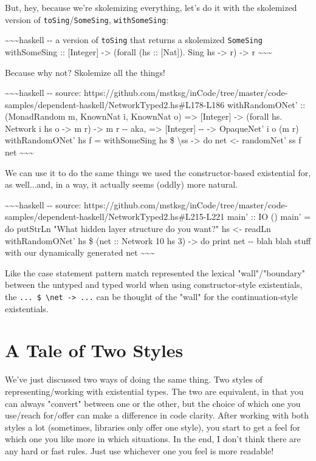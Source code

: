 \documentclass[]{article}
\begin{document}
But, hey, because we're skolemizing everything, let's do it with the skolemized
version of \texttt{toSing}/\texttt{SomeSing}, \texttt{withSomeSing}:

\textasciitilde{}\textasciitilde{}\textasciitilde{}haskell -\/- a version of
\texttt{toSing} that returns a skolemized \texttt{SomeSing} withSomeSing ::
{[}Integer{]} -\textgreater{} (forall (hs :: {[}Nat{]}). Sing hs -\textgreater{}
r) -\textgreater{} r \textasciitilde{}\textasciitilde{}\textasciitilde{}

Because why not? Skolemize all the things!

\textasciitilde{}\textasciitilde{}\textasciitilde{}haskell -\/- source:
https://github.com/mstksg/inCode/tree/master/code-samples/dependent-haskell/NetworkTyped2.hs\#L178-L186
withRandomONet' :: (MonadRandom m, KnownNat i, KnownNat o) =\textgreater{}
{[}Integer{]} -\textgreater{} (forall hs. Network i hs o -\textgreater{} m r)
-\textgreater{} m r -\/- aka, =\textgreater{} {[}Integer{]} -\/- -\textgreater{}
OpaqueNet' i o (m r) withRandomONet' hs f = withSomeSing hs \$
\textbackslash{}ss -\textgreater{} do net \textless{}- randomNet' ss f net
\textasciitilde{}\textasciitilde{}\textasciitilde{}

We can use it to do the same things we used the constructor-based existential
for, as well...and, in a way, it actually seems (oddly) more natural.

\textasciitilde{}\textasciitilde{}\textasciitilde{}haskell -\/- source:
https://github.com/mstksg/inCode/tree/master/code-samples/dependent-haskell/NetworkTyped2.hs\#L215-L221
main' :: IO () main' = do putStrLn "What hidden layer structure do you want?" hs
\textless{}- readLn withRandomONet' hs \$ (net :: Network 10 hs 3)
-\textgreater{} do print net -\/- blah blah stuff with our dynamically generated
net \textasciitilde{}\textasciitilde{}\textasciitilde{}

Like the case statement pattern match represented the lexical "wall"/"boundary"
between the untyped and typed world when using constructor-style existentials,
the \texttt{...\ \$\ \textbackslash{}net\ -\textgreater{}\ ...} can be thought
of the "wall" for the continuation-style existentials.

\section{A Tale of Two Styles}

We've just discussed two ways of doing the same thing. Two styles of
representing/working with existential types. The two are equivalent, in that you
can always "convert" between one or the other, but the choice of which one you
use/reach for/offer can make a difference in code clarity. After working with
both styles a lot (sometimes, libraries only offer one style), you start to get
a feel for which one you like more in which situations. In the end, I don't
think there are any hard or fast rules. Just use whichever one you feel is more
readable!
\end{document}
